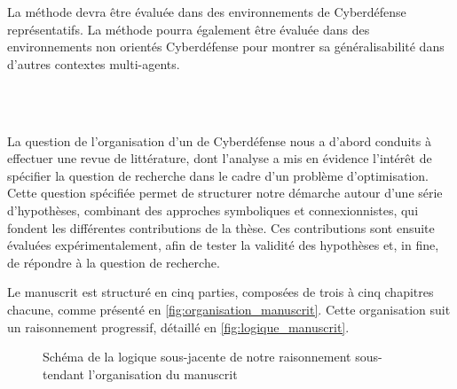 \noindent La méthode devra être évaluée dans des environnements de Cyberdéfense représentatifs. La méthode pourra également être évaluée dans des environnements non orientés Cyberdéfense pour montrer sa généralisabilité dans d'autres contextes multi-agents.

\

\bigskip

\\

\noindent
La question de l’organisation d’un  de Cyberdéfense nous a d’abord conduits à effectuer une revue de littérature, dont l’analyse a mis en évidence l’intérêt de spécifier la question de recherche dans le cadre d'un problème d’optimisation. Cette question spécifiée permet de structurer notre démarche autour d’une série d’hypothèses, combinant des approches symboliques et connexionnistes, qui fondent les différentes contributions de la thèse. Ces contributions sont ensuite évaluées expérimentalement, afin de tester la validité des hypothèses et, in fine, de répondre à la question de recherche.

\noindent
Le manuscrit est structuré en cinq parties, composées de trois à cinq chapitres chacune, comme présenté en \autoref{fig:organisation_manuscrit}. Cette organisation suit un raisonnement progressif, détaillé en \autoref{fig:logique_manuscrit}.

\begin{figure}[H]
  \centering
  \resizebox{0.8\textwidth}{!}{%
    
  }
  \caption{Schéma de la logique sous-jacente de notre raisonnement sous-tendant l'organisation du manuscrit}
  \label{fig:logique_manuscrit}
\end{figure}

